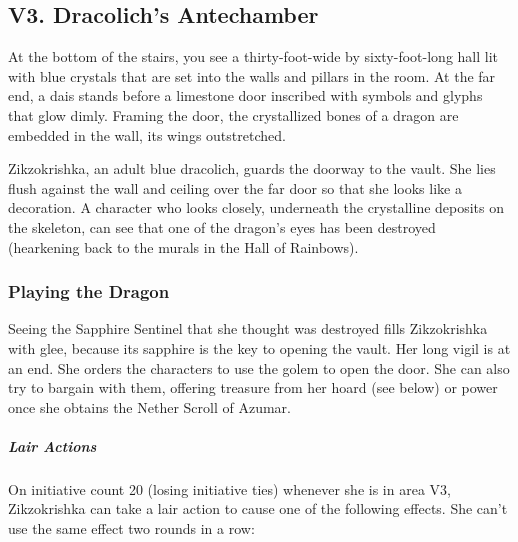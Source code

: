 \documentclass[10pt,a4paper,twoside,bg=print,twocolumn,openany,nodeprecatedcode]{dndbook}
\begin{document}
\subsection{V3. Dracolich's Antechamber}
\begin{DndReadAloud}{}
At the bottom of the stairs, you see a thirty-foot-wide by sixty-foot-long hall lit with blue crystals that are set into the walls and pillars in the room. At the far end, a dais stands before a limestone door inscribed with symbols and glyphs that glow dimly. Framing the door, the crystallized bones of a dragon are embedded in the wall, its wings outstretched.

\end{DndReadAloud}

Zikzokrishka, an adult blue dracolich, guards the doorway to the vault. She lies flush against the wall and ceiling over the far door so that she looks like a decoration. A character who looks closely, underneath the crystalline deposits on the skeleton, can see that one of the dragon's eyes has been destroyed (hearkening back to the murals in the Hall of Rainbows).

\subsubsection{Playing the Dragon}
Seeing the Sapphire Sentinel that she thought was destroyed fills Zikzokrishka with glee, because its sapphire is the key to opening the vault. Her long vigil is at an end. She orders the characters to use the golem to open the door. She can also try to bargain with them, offering treasure from her hoard (see below) or power once she obtains the Nether Scroll of Azumar.

\subparagraph{Lair Actions}
On initiative count 20 (losing initiative ties) whenever she is in area V3, Zikzokrishka can take a lair action to cause one of the following effects. She can't use the same effect two rounds in a row:
\end{document}
